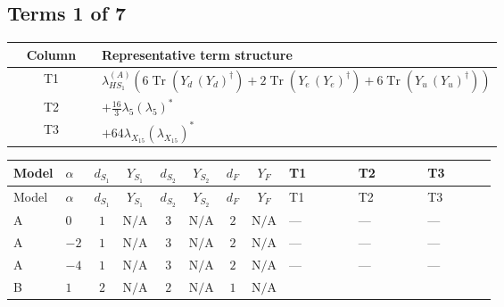 \documentclass[8pt]{article}
\begin{document}
\begin{landscape}
\subsection*{Terms 1 of 7}
\begin{center}
\begin{tabular}{@{}c >{\raggedright\arraybackslash}p{0.82\linewidth}@{}}
\toprule
Column & Representative term structure \\
\midrule
T1 & \(\displaystyle {\lambda_{HS_1}^{(A)}} (6 \operatorname{Tr}\!\left({Y_d}\,\left({Y_d}\right)^{\dagger}\right)+2 \operatorname{Tr}\!\left({Y_e}\,\left({Y_e}\right)^{\dagger}\right)+6 \operatorname{Tr}\!\left({Y_u}\,\left({Y_u}\right)^{\dagger}\right))\) \\
\midrule
T2 & \(\displaystyle +\frac{16}{3} {\lambda_5} \left({\lambda_5}\right)^{*}\) \\
\midrule
T3 & \(\displaystyle +64 {\lambda_{X_{15}}} \left({\lambda_{X_{15}}}\right)^{*}\) \\
\midrule
\bottomrule
\end{tabular}
\end{center}
\smallskip
\tiny
\begin{longtable}{@{}llcccccc >{\raggedright\arraybackslash}p{0.21\linewidth} >{\raggedright\arraybackslash}p{0.21\linewidth} >{\raggedright\arraybackslash}p{0.21\linewidth}@{}}
\toprule
Model & $\alpha$ & $d_{S_1}$ & $Y_{S_1}$ & $d_{S_2}$ & $Y_{S_2}$ & $d_F$ & $Y_F$ & T1 & T2 & T3 \\
\midrule
\endfirsthead
\toprule
Model & $\alpha$ & $d_{S_1}$ & $Y_{S_1}$ & $d_{S_2}$ & $Y_{S_2}$ & $d_F$ & $Y_F$ & T1 & T2 & T3 \\
\midrule
\endhead
A & $0$ & $1$ & $\text{N/A}$ & $3$ & $\text{N/A}$ & $2$ & $\text{N/A}$ & --- & --- & --- \\
\midrule
A & $-2$ & $1$ & $\text{N/A}$ & $3$ & $\text{N/A}$ & $2$ & $\text{N/A}$ & --- & --- & --- \\
\midrule
A & $-4$ & $1$ & $\text{N/A}$ & $3$ & $\text{N/A}$ & $2$ & $\text{N/A}$ & --- & --- & --- \\
\midrule
B & $1$ & $2$ & $\text{N/A}$ & $2$ & $\text{N/A}$ & $1$ & $\text{N/A}$ & \scriptsize\adjustbox{max width=\linewidth}{$\begin{gathered} {\lambda_{HS_1}^{(A)}} (6 \operatorname{Tr}\!\left({Y_d}\,\left({Y_d}\right)^{\dagger}\right)+2 \operatorname{Tr}\!\left({Y_e}\,\left({Y_e}\right)^{\dagger}\right)+6 \operatorname{Tr}\!\left({Y_u}\,\left({Y_u}\right)^{\dagger}\right))\end{gathered}$} & \scriptsize\adjustbox{max width=\linewidth}{$\begin{gathered} +\frac{16}{3} {\lambda_5} \left({\lambda_5}\right)^{*}\end{gathered}$} & \scriptsize\adjustbox{max width=\linewidth}{$\begin{gathered} +64 {\lambda_{X_{15}}} \left({\lambda_{X_{15}}}\right)^{*}\end{gathered}$} \\

\end{longtable}
\end{landscape}
\end{document}
